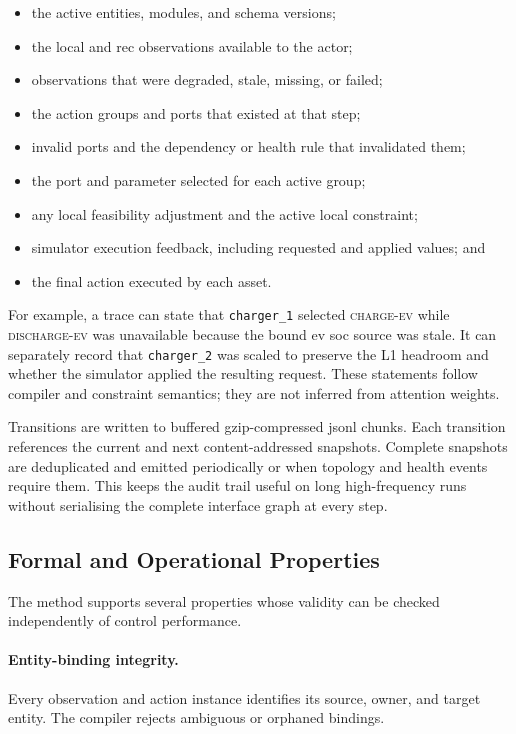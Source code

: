 \begin{itemize}
  \item the active entities, modules, and schema versions;
  \item the local and \gls{rec} observations available to the actor;
  \item observations that were degraded, stale, missing, or failed;
  \item the action groups and ports that existed at that step;
  \item invalid ports and the dependency or health rule that invalidated them;
  \item the port and parameter selected for each active group;
  \item any local feasibility adjustment and the active local constraint;
  \item simulator execution feedback, including requested and applied values; and
  \item the final action executed by each asset.
\end{itemize}

For example, a trace can state that \texttt{charger\_1} selected \textsc{charge-ev} while \textsc{discharge-ev} was unavailable because the bound \gls{ev} \gls{soc} source was stale. It can separately record that \texttt{charger\_2} was scaled to preserve the L1 headroom and whether the simulator applied the resulting request. These statements follow compiler and constraint semantics; they are not inferred from attention weights.

Transitions are written to buffered gzip-compressed \gls{jsonl} chunks. Each transition references the current and next content-addressed snapshots. Complete snapshots are deduplicated and emitted periodically or when topology and health events require them. This keeps the audit trail useful on long high-frequency runs without serialising the complete interface graph at every step.

\subsection{Formal and Operational Properties}
\label{sec:timarl-properties}

The method supports several properties whose validity can be checked independently of control performance.

\paragraph{Entity-binding integrity.}
Every observation and action instance identifies its source, owner, and target entity. The compiler rejects ambiguous or orphaned bindings.

